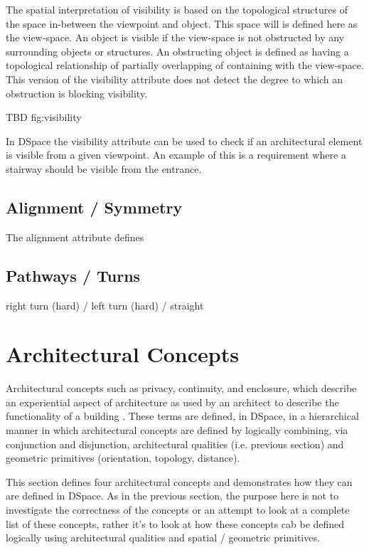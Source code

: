 \documentclass[12pt]{ucthesis}
\begin{document}
The spatial interpretation of visibility is based on the topological structures of the space in-between the viewpoint and object. This space will is defined here as the view-space. An object is visible if the view-space is not obstructed by any surrounding objects or structures. An obstructing object is defined as having a topological relationship of partially overlapping of containing with the view-space. This version of the visibility attribute does not detect the degree to which an obstruction is blocking visibility. 

TBD fig:visibility

In DSpace the visibility attribute can be used to check if an architectural element is visible from a given viewpoint. An example of this is a requirement where a stairway should be visible from the entrance.


\subsection{Alignment / Symmetry}
The alignment attribute defines 

\subsection{Pathways / Turns}  right turn (hard) / left turn (hard) / straight 


\section{Architectural Concepts}
Architectural concepts such as privacy, continuity, and enclosure, which describe an experiential aspect of architecture as used by an architect to describe the functionality of a building \cite{Koile}. These terms are defined, in DSpace, in a hierarchical manner in which architectural concepts are defined by logically combining, via conjunction and disjunction, architectural qualities (i.e. previous section) and geometric primitives (orientation, topology, distance). 

This section defines four architectural concepts and demonstrates how they can are defined in DSpace. As in the previous section, the purpose here is not to investigate the correctness of the concepts or an attempt to look at a complete list of these concepts, rather it's to look at how these concepts cab be defined logically using architectural qualities and spatial / geometric primitives.
\end{document}
